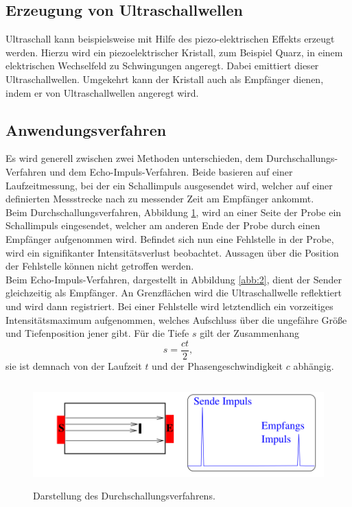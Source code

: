 \subsection{Erzeugung von Ultraschallwellen}
Ultraschall kann beispielsweise mit Hilfe des piezo-elektrischen Effekts erzeugt werden.
Hierzu wird ein piezoelektrischer Kristall, zum Beispiel Quarz, in einem elektrischen Wechselfeld zu Schwingungen angeregt.
Dabei emittiert dieser Ultraschallwellen.
Umgekehrt kann der Kristall auch als Empfänger dienen, indem er von Ultraschallwellen angeregt wird.

\subsection{Anwendungsverfahren}
Es wird generell zwischen zwei Methoden unterschieden, dem Durchschallungs-Verfahren und dem Echo-Impuls-Verfahren.
Beide basieren auf einer Laufzeitmessung, bei der ein Schallimpuls ausgesendet wird, welcher auf einer definierten Messstrecke nach zu messender Zeit am Empfänger ankommt.\\
Beim Durchschallungsverfahren, Abbildung \ref{abb:1}, wird an einer Seite der Probe ein Schallimpuls eingesendet, welcher am anderen Ende der Probe durch einen Empfänger aufgenommen wird.
Befindet sich nun eine Fehlstelle in der Probe, wird ein signifikanter Intensitätsverlust beobachtet.
Aussagen über die Position der Fehlstelle können nicht getroffen werden.\\
Beim Echo-Impuls-Verfahren, dargestellt in Abbildung \ref{abb:2}, dient der Sender gleichzeitig als Empfänger.
An Grenzflächen wird die Ultraschallwelle reflektiert und wird dann registriert.
Bei einer Fehlstelle wird letztendlich ein vorzeitiges Intensitätsmaximum aufgenommen, welches Aufschluss über die ungefähre Größe und Tiefenposition jener gibt.
Für die Tiefe $s$ gilt der Zusammenhang
\begin{equation}
  s = \frac{ct}{2},
\end{equation}
sie ist demnach von der Laufzeit $t$ und der Phasengeschwindigkeit $c$ abhängig.

\begin{figure}[H]
  \centering
  \includegraphics[height=4cm]{ressources/durch.png}
  \caption{Darstellung des Durchschallungsverfahrens. \cite{skript}}
  \label{abb:1}
\end{figure}

